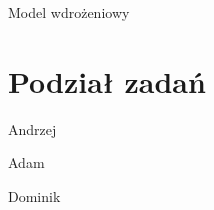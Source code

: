 \documentclass[a4paper,10pt]{beamer}
\begin{document}
		\begin{frame}{Model wdrożeniowy}
			
		\end{frame}
		
		\section{Podział zadań}
		
		\begin{frame}{Andrzej}
			
		\end{frame}
		
		\begin{frame}{Adam}
			
		\end{frame}
		
		\begin{frame}{Dominik}
			
		\end{frame}
		
\end{document}
